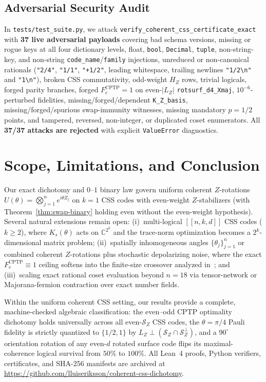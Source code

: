 \documentclass[11pt,a4paper]{article}
\theoremstyle{plain}
\theoremstyle{definition}
\newcommand{\C}{\mathbb{C}}
\newcommand{\SZ}{\mathcal{S}_Z}
\begin{document}
\subsection{Adversarial Security Audit}

In \texttt{tests/test\_suite.py}, we attack \texttt{verify\_\allowbreak coherent\_\allowbreak css\_\allowbreak certificate\_\allowbreak exact} with \textbf{37 live adversarial payloads} covering bad schema versions, missing or rogue keys at all four dictionary levels, float, \texttt{bool}, \texttt{Decimal}, \texttt{tuple}, non-string-key, and non-string \texttt{code\_name}/\texttt{family} injections, unreduced or non-canonical rationals (\texttt{"2/4"}, \texttt{"1/1"}, \texttt{"+1/2"}, leading whitespace, trailing newlines \texttt{"1/2\textbackslash n"} and \texttt{"1\textbackslash n"}), broken CSS commutativity, odd-weight $H_Z$ rows, trivial logicals, forged parity branches, forged $F_e^{\mathrm{CPTP}} = 1$ on even-$|L_Z|$ \texttt{rotsurf\_d4\_Xmaj}, $10^{-6}$-perturbed fidelities, missing/forged/dependent \texttt{K\_Z\_basis}, missing/forged/spurious swap-immunity witnesses, missing mandatory $p=1/2$ points, and tampered, reversed, non-integer, or duplicated coset enumerators. All \textbf{37/37 attacks are rejected} with explicit \texttt{ValueError} diagnostics.

\section{Scope, Limitations, and Conclusion}

Our exact dichotomy and $0$--$1$ binary law govern uniform coherent $Z$-rotations $U(\theta) = \bigotimes_{j=1}^n e^{i\theta Z_j}$ on $k=1$ CSS codes with even-weight $Z$-stabilizers (with Theorem~\ref{thm:swap-binary} holding even without the even-weight hypothesis). Several natural extensions remain open: (i)~multi-logical $[[n,k,d]]$ CSS codes ($k \ge 2$), where $K_s(\theta)$ acts on $\C^{2^k}$ and the trace-norm optimization becomes a $2^k$-dimensional matrix problem; (ii)~spatially inhomogeneous angles $\{\theta_j\}_{j=1}^n$ or combined coherent $Z$-rotations plus stochastic depolarizing noise, where the exact $F_e^{\mathrm{CPTP}} \equiv 1$ ceiling softens into the finite-size crossover analyzed in~\cite{Dai2026CoherentSurface}; and (iii)~scaling exact rational coset evaluation beyond $n=18$ via tensor-network or Majorana-fermion contraction over exact number fields.

Within the uniform coherent CSS setting, our results provide a complete, machine-checked algebraic classification: the even--odd CPTP optimality dichotomy holds universally across all even-$\SZ$ CSS codes, the $\theta = \pi/4$ Pauli fidelity is strictly quantized to $\{1/2, 1\}$ by $L_Z \perp (\SZ \cap \SZ^\perp)$, and a $90^\circ$ orientation rotation of any even-$d$ rotated surface code flips its maximal-coherence logical survival from $50\%$ to $100\%$. All Lean~4 proofs, Python verifiers, certificates, and SHA-256 manifests are archived at \url{https://github.com/lluiseriksson/coherent-css-dichotomy}.



\end{document}

